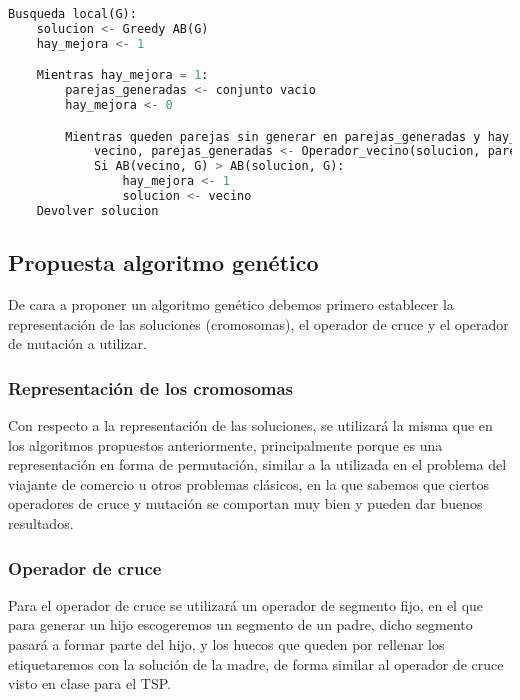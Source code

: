 \begin{lstlisting}[language=python]
Busqueda local(G):
	solucion <- Greedy AB(G)
	hay_mejora <- 1

	Mientras hay_mejora = 1:
		parejas_generadas <- conjunto vacio
		hay_mejora <- 0

		Mientras queden parejas sin generar en parejas_generadas y hay_mejora = 0:
			vecino, parejas_generadas <- Operador_vecino(solucion, parejas_generadas)
			Si AB(vecino, G) > AB(solucion, G):
				hay_mejora <- 1
				solucion <- vecino
	Devolver solucion
\end{lstlisting}

\subsection{Propuesta algoritmo genético}

De cara a proponer un algoritmo genético debemos primero establecer la representación de las soluciones (cromosomas), el operador de cruce y el operador de mutación a utilizar.

\subsubsection{Representación de los cromosomas}

Con respecto a la representación de las soluciones, se utilizará la misma que en los algoritmos propuestos anteriormente, principalmente porque es una representación en forma de permutación, similar a la utilizada en el problema del viajante de comercio u otros problemas clásicos, en la que sabemos que ciertos operadores de cruce y mutación se comportan muy bien y pueden dar buenos resultados.

\subsubsection{Operador de cruce}

Para el operador de cruce se utilizará un operador de segmento fijo, en el que para generar un hijo escogeremos un segmento de un padre, dicho segmento pasará a formar parte del hijo, y los huecos que queden por rellenar los etiquetaremos con la solución de la madre, de forma similar al operador de cruce visto en clase para el TSP.

